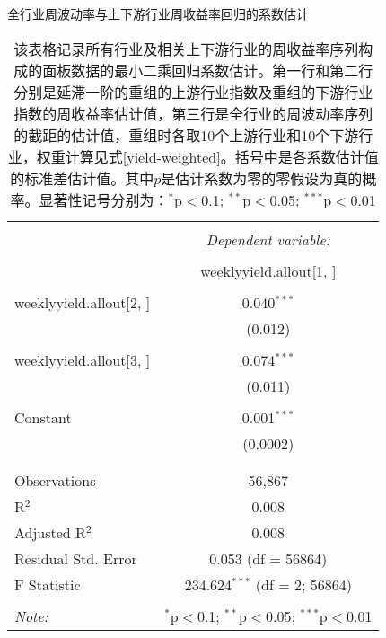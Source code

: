 \documentclass{sysuthesis}
\begin{document}
\begin{table}[!htbp] \centering 
\caption{全行业周波动率与上下游行业周收益率回归的系数估计} 
  \caption*{\footnotesize 该表格记录所有行业及相关上下游行业的周收益率序列构成的面板数据的最小二乘回归系数估计。第一行和第二行分别是延滞一阶的重组的上游行业指数及重组的下游行业指数的周收益率估计值，第三行是全行业的周波动率序列的截距的估计值，重组时各取10个上游行业和10个下游行业，权重计算见式\ref{yield-weighted}。括号中是各系数估计值的标准差估计值。其中$p$是估计系数为零的零假设为真的概率。显著性记号分别为：{$^{*}$p$<$0.1; $^{**}$p$<$0.05; $^{***}$p$<$0.01}} 
  \renewcommand{\arraystretch}{0.5}
\begin{tabular}{@{\extracolsep{5pt}}lc} 
\\[-1.8ex]\hline 
\hline \\[-1.8ex] 
 & \multicolumn{1}{c}{\textit{Dependent variable:}} \\ 
\cline{2-2} 
\\[-1.8ex] & weeklyyield.allout[1, ] \\ 
\hline \\[-1.8ex] 
 weeklyyield.allout[2, ] & 0.040$^{***}$ \\ 
  & (0.012) \\ 
  & \\ 
 weeklyyield.allout[3, ] & 0.074$^{***}$ \\ 
  & (0.011) \\ 
  & \\ 
 Constant & 0.001$^{***}$ \\ 
  & (0.0002) \\ 
  & \\ 
\hline \\[-1.8ex] 
Observations & 56,867 \\ 
R$^{2}$ & 0.008 \\ 
Adjusted R$^{2}$ & 0.008 \\ 
Residual Std. Error & 0.053 (df = 56864) \\ 
F Statistic & 234.624$^{***}$ (df = 2; 56864) \\ 
\hline 
\hline \\[-1.8ex] 
\textit{Note:}  & \multicolumn{1}{r}{$^{*}$p$<$0.1; $^{**}$p$<$0.05; $^{***}$p$<$0.01} \\ 
\end{tabular} 
\end{table} 
\end{document}

